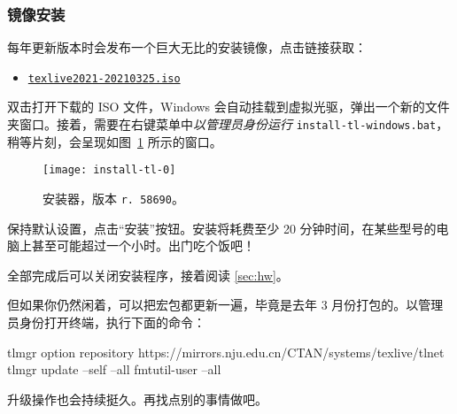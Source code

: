 \subsubsection{镜像安装}
\label{subsubsec:tl-from-iso}

\begin{widepar}
每年更新版本时会发布一个巨大无比的安装镜像，点击链接获取：
\end{widepar}

\begin{itemize}
  \item \href{https://mirrors.nju.edu.cn/CTAN/systems/texlive/Images/texlive2021-20210325.iso}{\faFile*[regular] \texttt{texlive2021-20210325.iso}}
\end{itemize}

双击打开下载的 ISO 文件，Windows 会自动挂载到虚拟光驱，弹出一个新的文件夹窗口。接着，需要在右键菜单中\emph{以管理员身份运行} \texttt{install-tl-windows.bat}，稍等片刻，会呈现如图~\ref{fig:install-tl-0} 所示的窗口。

\begin{figure}[htbp]
  \texttt{[image: install-tl-0]}
  \caption{安装器，版本 \texttt{r. 58690}。}
  \label{fig:install-tl-0}
\end{figure}

保持默认设置，点击“安装”按钮。安装将耗费至少 20 分钟时间，在某些型号的电脑上甚至可能超过一个小时。出门吃个饭吧！

全部完成后可以关闭安装程序，接着阅读 \ref{sec:hw}。

但如果你仍然闲着，可以把宏包都更新一遍，毕竟是去年 3 月份打包的。以管理员身份打开终端，执行下面的命令：

\vspace*{-0.7cm}
\begin{widepar}
\begin{shellexample}[morekeywords={tlmgr,fmtutil-user},emph={option,update},
  xleftmargin = 0.5 em, xrightmargin = 1 em]
  tlmgr option repository https://mirrors.nju.edu.cn/CTAN/systems/texlive/tlnet
  tlmgr update --self --all
  fmtutil-user --all
\end{shellexample}
\end{widepar}

升级操作也会持续挺久。再找点别的事情做吧。

